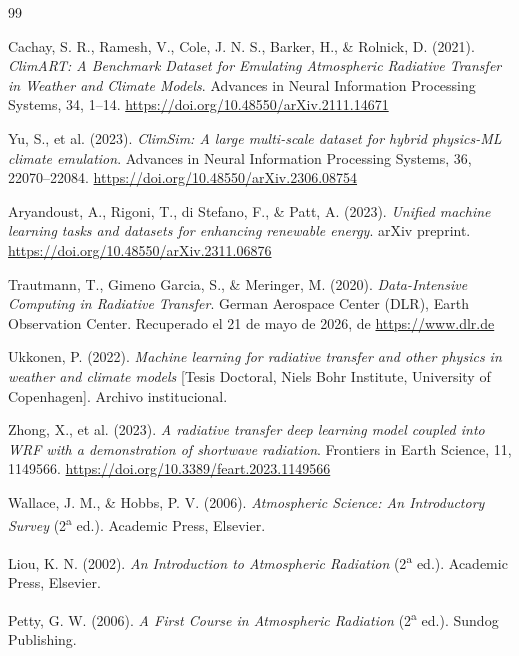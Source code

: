 \documentclass[11pt,a4paper,twoside,pdf]{article}
\numberwithin{equation}{section}
\begin{document}
\newpage



\begin{thebibliography}{99}

Cachay, S. R., Ramesh, V., Cole, J. N. S., Barker, H., \& Rolnick, D. (2021). 
\textit{ClimART: A Benchmark Dataset for Emulating Atmospheric Radiative Transfer in Weather and Climate Models}. 
Advances in Neural Information Processing Systems, 34, 1--14. 
\url{https://doi.org/10.48550/arXiv.2111.14671}

Yu, S., et al. (2023). 
\textit{ClimSim: A large multi-scale dataset for hybrid physics-ML climate emulation}. 
Advances in Neural Information Processing Systems, 36, 22070--22084. 
\url{https://doi.org/10.48550/arXiv.2306.08754}

Aryandoust, A., Rigoni, T., di Stefano, F., \& Patt, A. (2023). 
\textit{Unified machine learning tasks and datasets for enhancing renewable energy}. 
arXiv preprint. \url{https://doi.org/10.48550/arXiv.2311.06876}

Trautmann, T., Gimeno Garcia, S., \& Meringer, M. (2020). 
\textit{Data-Intensive Computing in Radiative Transfer}. 
German Aerospace Center (DLR), Earth Observation Center. 
Recuperado el 21 de mayo de 2026, de \url{https://www.dlr.de}

Ukkonen, P. (2022). 
\textit{Machine learning for radiative transfer and other physics in weather and climate models} [Tesis Doctoral, Niels Bohr Institute, University of Copenhagen]. Archivo institucional.

Zhong, X., et al. (2023). 
\textit{A radiative transfer deep learning model coupled into WRF with a demonstration of shortwave radiation}. 
Frontiers in Earth Science, 11, 1149566. 
\url{https://doi.org/10.3389/feart.2023.1149566}

Wallace, J. M., \& Hobbs, P. V. (2006). 
\textit{Atmospheric Science: An Introductory Survey} (2\textsuperscript{a} ed.). 
Academic Press, Elsevier.

Liou, K. N. (2002). 
\textit{An Introduction to Atmospheric Radiation} (2\textsuperscript{a} ed.). 
Academic Press, Elsevier.

Petty, G. W. (2006). 
\textit{A First Course in Atmospheric Radiation} (2\textsuperscript{a} ed.). 
Sundog Publishing.

\end{thebibliography}
\end{document}
